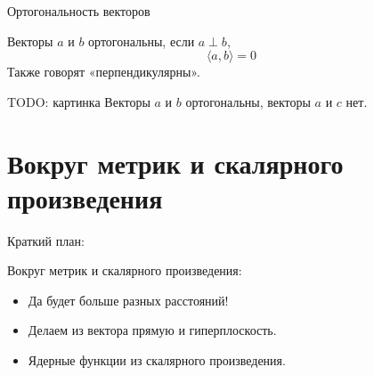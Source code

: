 \documentclass[14pt,xcolor=dvipsnames]{beamer}
\begin{document}
  





\begin{frame}{Ортогональность векторов}
  
\begin{block}{Векторы $a$ и $b$ ортогональны, если $a\perp b$,}
\[
  \langle a, b \rangle =0
\]
Также говорят «перпендикулярны».
\end{block}
  
\begin{block}{TODO: картинка}
Векторы $a$ и $b$ ортогональны, векторы $a$ и $c$ нет.
\end{block}

\end{frame}
  




\section{Вокруг метрик и скалярного произведения}

\begin{frame}{Краткий план:}

\begin{block}{Вокруг метрик и скалярного произведения:}
\begin{itemize} %
  \item Да будет больше разных расстояний!
  \item Делаем из вектора прямую и гиперплоскость.
  \item Ядерные функции из скалярного произведения.
\end{itemize}
\end{block}

\end{frame}
\end{document}
